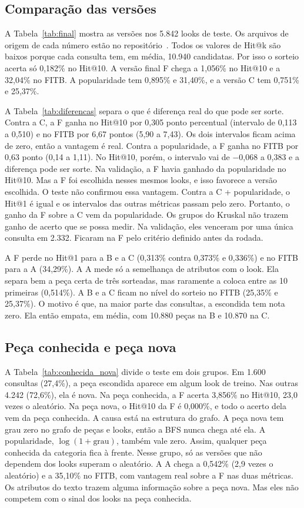 \subsection{Comparação das versões}

A Tabela~\ref{tab:final} mostra as versões nos 5.842 looks de teste. Os arquivos de origem de cada número estão no repositório~\cite{repositorio}. Todos os valores de Hit@k são baixos porque cada consulta tem, em média, 10.940 candidatas. Por isso o sorteio acerta só 0,182\% no Hit@10. A versão final F chega a 1,056\% no Hit@10 e a 32,04\% no FITB. A popularidade tem 0,895\% e 31,40\%, e a versão C tem 0,751\% e 25,37\%.

A Tabela~\ref{tab:diferencas} separa o que é diferença real do que pode ser sorte. Contra a C, a F ganha no Hit@10 por 0,305 ponto percentual (intervalo de 0,113 a 0,510) e no FITB por 6,67 pontos (5,90 a 7,43). Os dois intervalos ficam acima de zero, então a vantagem é real. Contra a popularidade, a F ganha no FITB por 0,63 ponto (0,14 a 1,11). No Hit@10, porém, o intervalo vai de $-$0,068 a 0,383 e a diferença pode ser sorte. Na validação, a F havia ganhado da popularidade no Hit@10. Mas a F foi escolhida nesses mesmos looks, e isso favorece a versão escolhida. O teste não confirmou essa vantagem. Contra a C + popularidade, o Hit@1 é igual e os intervalos das outras métricas passam pelo zero. Portanto, o ganho da F sobre a C vem da popularidade. Os grupos do Kruskal não trazem ganho de acerto que se possa medir. Na validação, eles venceram por uma única consulta em 2.332. Ficaram na F pelo critério definido antes da rodada.

A F perde no Hit@1 para a B e a C (0,313\% contra 0,373\% e 0,336\%) e no FITB para a A (34,29\%). A A mede só a semelhança de atributos com o look. Ela separa bem a peça certa de três sorteadas, mas raramente a coloca entre as 10 primeiras (0,514\%). A B e a C ficam no nível do sorteio no FITB (25,35\% e 25,37\%). O motivo é que, na maior parte das consultas, a escondida tem nota zero. Ela então empata, em média, com 10.880 peças na B e 10.870 na C.

\subsection{Peça conhecida e peça nova}

A Tabela~\ref{tab:conhecida_nova} divide o teste em dois grupos. Em 1.600 consultas (27,4\%), a peça escondida aparece em algum look de treino. Nas outras 4.242 (72,6\%), ela é nova. Na peça conhecida, a F acerta 3,856\% no Hit@10, 23,0 vezes o aleatório. Na peça nova, o Hit@10 da F é 0,000\%, e todo o acerto dela vem da peça conhecida. A causa está na estrutura do grafo. A peça nova tem grau zero no grafo de peças e looks, então a BFS nunca chega até ela. A popularidade, $\log(1+\text{grau})$, também vale zero. Assim, qualquer peça conhecida da categoria fica à frente. Nesse grupo, só as versões que não dependem dos looks superam o aleatório. A A chega a 0,542\% (2,9 vezes o aleatório) e a 35,10\% no FITB, com vantagem real sobre a F nas duas métricas. Os atributos do texto trazem alguma informação sobre a peça nova. Mas eles não competem com o sinal dos looks na peça conhecida.

